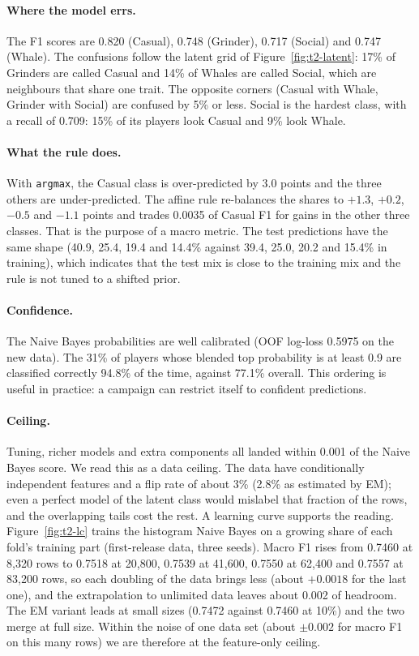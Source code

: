 \documentclass[../main.tex]{subfiles}
\begin{document}
\paragraph{Where the model errs.} The F1 scores are 0.820 (Casual), 0.748 (Grinder), 0.717 (Social) and 0.747 (Whale). The confusions follow the latent grid of Figure~\ref{fig:t2-latent}: 17\% of Grinders are called Casual and 14\% of Whales are called Social, which are neighbours that share one trait. The opposite corners (Casual with Whale, Grinder with Social) are confused by 5\% or less. Social is the hardest class, with a recall of 0.709: 15\% of its players look Casual and 9\% look Whale.

\paragraph{What the rule does.} With \texttt{argmax}, the Casual class is over-predicted by 3.0 points and the three others are under-predicted. The affine rule re-balances the shares to $+1.3$, $+0.2$, $-0.5$ and $-1.1$ points and trades 0.0035 of Casual F1 for gains in the other three classes. That is the purpose of a macro metric. The test predictions have the same shape (40.9, 25.4, 19.4 and 14.4\% against 39.4, 25.0, 20.2 and 15.4\% in training), which indicates that the test mix is close to the training mix and the rule is not tuned to a shifted prior.

\paragraph{Confidence.} The Naive Bayes probabilities are well calibrated (OOF log-loss 0.5975 on the new data). The 31\% of players whose blended top probability is at least 0.9 are classified correctly 94.8\% of the time, against 77.1\% overall. This ordering is useful in practice: a campaign can restrict itself to confident predictions.

\paragraph{Ceiling.} Tuning, richer models and extra components all landed within 0.001 of the Naive Bayes score. We read this as a data ceiling. The data have conditionally independent features and a flip rate of about 3\% (2.8\% as estimated by EM); even a perfect model of the latent class would mislabel that fraction of the rows, and the overlapping tails cost the rest. A learning curve supports the reading. Figure~\ref{fig:t2-lc} trains the histogram Naive Bayes on a growing share of each fold's training part (first-release data, three seeds). Macro F1 rises from 0.7460 at 8{,}320 rows to 0.7518 at 20{,}800, 0.7539 at 41{,}600, 0.7550 at 62{,}400 and 0.7557 at 83{,}200 rows, so each doubling of the data brings less (about $+0.0018$ for the last one), and the extrapolation to unlimited data leaves about 0.002 of headroom. The EM variant leads at small sizes (0.7472 against 0.7460 at 10\%) and the two merge at full size. Within the noise of one data set (about $\pm0.002$ for macro F1 on this many rows) we are therefore at the feature-only ceiling.
\end{document}
